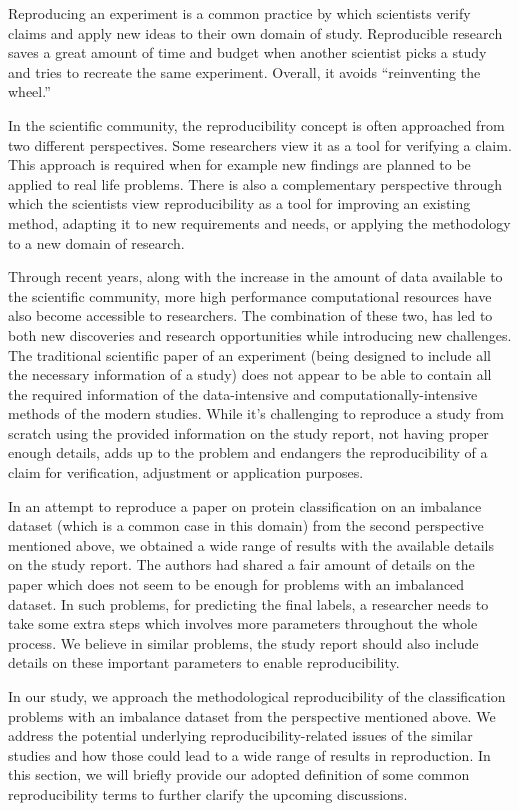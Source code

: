Reproducing an experiment is a common practice by which scientists verify claims and apply new ideas to their 
own domain of study. Reproducible research saves a great amount of time and budget when another scientist picks 
a study and tries to recreate the same experiment. Overall, it avoids “reinventing the wheel.”

In the scientific community, the reproducibility concept is often approached from two different perspectives. 
Some researchers view it as a tool for verifying a claim. This approach is required when for example new 
findings are planned to be applied to real life problems. There is also a complementary perspective through 
which the scientists view reproducibility as a tool for improving an existing method, adapting it to new 
requirements and needs, or applying the methodology to a new domain of research.

Through recent years, along with the increase in the amount of data available to the scientific community, 
more high performance computational resources have also become accessible to researchers. The combination 
of these two, has led to both new discoveries and research opportunities while introducing new challenges. 
The traditional scientific paper of an experiment (being designed to include all the necessary information 
of a study) does not appear to be able to contain all the required information of the data-intensive and 
computationally-intensive methods of the modern studies. While it’s challenging to reproduce a study from 
scratch using the provided information on the study report, not having proper enough details, adds up to 
the problem and endangers the reproducibility of a claim for verification, adjustment or application purposes.

In an attempt to reproduce a paper on protein classification on an imbalance dataset (which is a common case 
in this domain) from the second perspective mentioned above, we obtained a wide range of results with the 
available details on the study report. The authors had shared a fair amount of details on the paper which 
does not seem to be enough for problems with an imbalanced dataset. In such problems, for predicting the final 
labels, a researcher needs to take some extra steps which involves more parameters throughout the whole process. 
We believe in similar problems, the study report should also include details on these important parameters to 
enable reproducibility.

In our study, we approach the methodological reproducibility of the classification problems with an imbalance 
dataset from the perspective mentioned above. We address the potential underlying reproducibility-related issues 
of the similar studies and how those could lead to a wide range of results in reproduction. In this section, we 
will briefly provide our adopted definition of some common reproducibility terms to further clarify the 
upcoming discussions.

